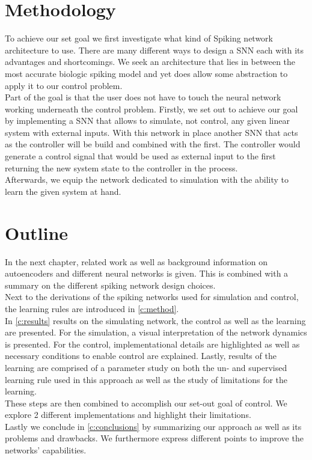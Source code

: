 \section{Methodology}
To achieve our set goal we first investigate what kind of Spiking network architecture to use. There are many different ways to design a \ac{SNN} each with its advantages and shortcomings.
We seek an architecture that lies in between the most accurate biologic spiking model and yet does allow some abstraction to apply it to our control problem.\\
Part of the goal is that the user does not have to touch the neural network working underneath the control problem.
Firstly, we set out to achieve our goal by implementing a \ac{SNN} that allows to simulate, not control, any given linear system with external inputs. With this network in place another \ac{SNN} that acts as the controller will be build and combined with the first. The controller would generate a control signal that would be used as external input to the first returning the new system state to the controller in the process.\\
Afterwards, we equip the network dedicated to simulation with the ability to learn the given system at hand.\\


\section{Outline}
In the next chapter, related work as well as background information on autoencoders and different neural networks is given. This is combined with a summary on the different spiking network design choices.\\
Next to the derivations of the spiking networks used for simulation and control, the learning rules are introduced in \cref{c:method}.\\
In \cref{c:results} results on the simulating network, the control as well as the learning are presented. For the simulation, a visual interpretation of the network dynamics is presented. For the control, implementational details are highlighted as well as necessary conditions to enable control are explained.
Lastly, results of the learning are comprised of a parameter study on both the un- and supervised learning rule used in this approach as well as the study of limitations for the learning.\\
These steps are then combined to accomplish our set-out goal of control. We explore 2 different implementations and highlight their limitations.\\
Lastly we conclude in \cref{c:conclusions} by summarizing our approach as well as its problems and drawbacks. We furthermore express different points to improve the networks' capabilities.
